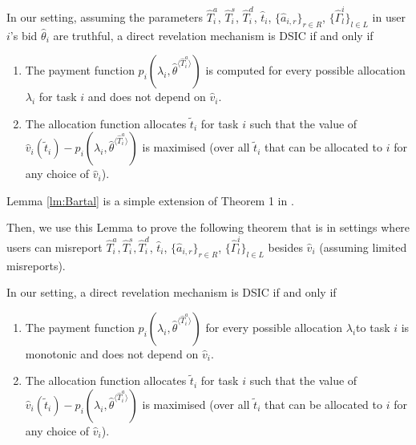 \documentclass[11pt]{phdthesis}
\begin{document}
\begin{lemma}\label{lm:Bartal}
    In our setting, assuming the parameters $\hat{T}_i^a$, $\hat{T}_i^s$, $\hat{T}_i^d$, $ \hat{t}_i $, $ \{ \hat{a}_{i,r} \}_{r \in R} $, $ \{ \hat{\Gamma}_l^i \}_{l \in L} $ in user $ i $'s bid $ \hat{\theta}_i $ are truthful, a direct revelation mechanism is DSIC if and only if
    
    \begin{enumerate}
        \item The payment function $p_i(\lambda_i, \hat{\theta}^{\langle \hat{T}_i^a \rangle})
        $ is computed for every possible allocation $  \lambda_i$ for task $i$ and does not depend on $\hat{v}_i$.
        \item The allocation function allocates $\tilde{t}_i$ for task $i$ such that the value of $\hat{v}_i( \tilde{t}_i)-p_i(\lambda_i, \hat{\theta}^{\langle \hat{T}_i^a \rangle}) $ is maximised (over all $\tilde{t}_i$ that can be allocated to $i$ for any choice of $\hat{v}_i$).
    \end{enumerate}
\end{lemma}

Lemma \ref{lm:Bartal} is a simple extension of Theorem 1 in \citep{bartal2003incentive}. 

Then, we use this Lemma to prove the following theorem that is in settings where users can misreport $ \hat{T}_i^a,\hat{T}_i^s,\hat{T}_i^d $, $ \hat{t}_i $, $ \{ \hat{a}_{i,r} \}_{r \in R} $, $ \{ \hat{\Gamma}_l^i \}_{l \in L} $ besides $\hat{v}_i$ (assuming limited misreports).

\begin{theorem} \label{th: DSIC}
    In our setting, a direct revelation mechanism is DSIC if and only if
    \begin{enumerate}
        \item The payment function $p_i(\lambda_i, \hat{\theta}^{\langle \hat{T}_i^a \rangle}) $ for every possible allocation $ \lambda_i$to task $i$ is monotonic and does not depend on $\hat{v}_i$.
        \item The allocation function allocates $ \tilde{t}_i  $ for task $i$ such that the value of $\hat{v}_i( \tilde{t}_i)-p_i(\lambda_i, \hat{\theta}^{\langle \hat{T}_i^a \rangle}) $ is maximised (over all $ \tilde{t}_i$ that can be allocated to $i$ for any choice of $\hat{v}_i$).
    \end{enumerate}
\end{theorem}
\end{document}
